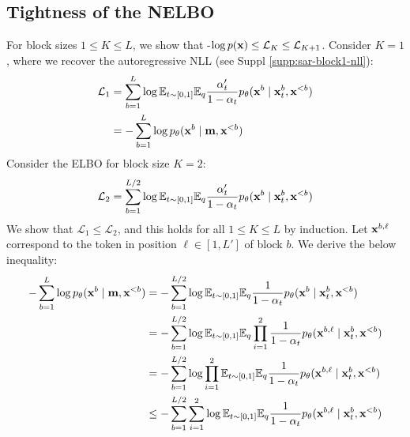 \documentclass{article} %
\begin{document}

\subsection{Tightness of the NELBO}\label{supp:sar-elbo-tightness}
For block sizes $1 \leq K \leq L$, we show that -$\log p({\mathbf x}) \leq \mathcal{L}_{K} \leq \mathcal{L}_{K+1}$. Consider $K=1$, where we recover the autoregressive NLL (see Suppl \ref{supp:sar-block1-nll}):
\begin{align}
    \mathcal{L}_1 &= \sum_{b=1}^{L} \log \mathbb{E}_{t \sim [0, 1]} \mathbb{E}_q \frac{\alpha_{t}'}{1-\alpha_{t}} p_\theta({\mathbf x}^b \mid {\mathbf x}_t^b,{\mathbf x}^{<b}) \nonumber \\
    &= - \sum_{b=1}^{L}  \log p_\theta({\mathbf x}^b \mid {\mathbf m},{\mathbf x}^{<b})
\end{align}
Consider the ELBO for block size $K=2$:
\begin{align}
    \mathcal{L}_2 = \sum_{b=1}^{L/2} \log \mathbb{E}_{t \sim [0, 1]} \mathbb{E}_q \frac{\alpha_{t}'}{1-\alpha_{t}} p_\theta({\mathbf x}^b \mid {\mathbf x}_t^b, {\mathbf x}^{<b})
\end{align}
We show that $\mathcal{L}_1 \leq \mathcal{L}_2$, and this holds for all $1 \leq K \leq L$ by induction. Let ${\mathbf x}^{b, \ell}$ correspond to the token in position $\ell \in [1, L']$ of block $b$. We derive the below inequality:
\begin{align}
    - \sum_{b=1}^{L} \log  p_\theta({\mathbf x}^b \mid {\mathbf m}, {\mathbf x}^{<b}) &= -\sum_{b=1}^{L/2} \log \mathbb{E}_{t \sim [0, 1]} \mathbb{E}_q \frac{1}{1-\alpha_{t}} p_\theta({\mathbf x}^b \mid {\mathbf x}_t^b, {\mathbf x}^{<b}) \nonumber \\
    &= - \sum_{b=1}^{L/2} \log \mathbb{E}_{t \sim [0, 1]} \mathbb{E}_q \prod_{i=1}^2 \frac{1}{1-\alpha_{t}} p_\theta({\mathbf x}^{b, \ell} \mid {\mathbf x}_t^b, {\mathbf x}^{<b}) \nonumber \\
    &= - \sum_{b=1}^{L/2} \log \prod_{i=1}^2\mathbb{E}_{t \sim [0, 1]} \mathbb{E}_q \frac{1}{1-\alpha_{t}} p_\theta({\mathbf x}^{b, \ell} \mid {\mathbf x}_t^b, {\mathbf x}^{<b}) \nonumber \\
    &\leq - \sum_{b=1}^{L/2} \sum_{i=1}^2 \log \mathbb{E}_{t \sim [0, 1]} \mathbb{E}_q \frac{1}{1-\alpha_{t}} p_\theta({\mathbf x}^{b, \ell} \mid {\mathbf x}_t^b, {\mathbf x}^{<b})
\end{align}
\end{document}
